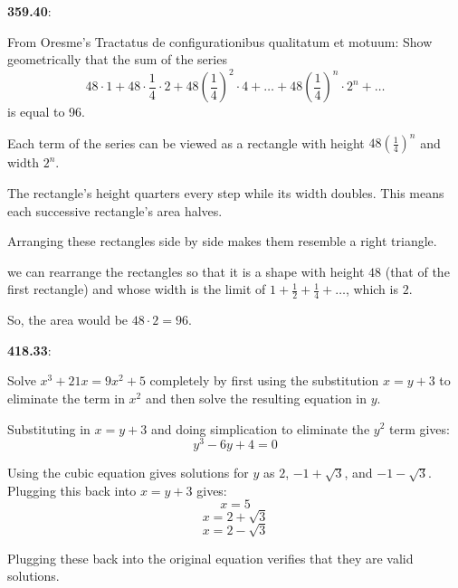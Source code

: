 \documentclass{article}
\begin{document}
\textbf{359.40}:

From Oresme's Tractatus de configurationibus qualitatum et motuum:
Show geometrically that the sum of the series
\[48 \cdot 1 + 48 \cdot \frac{1}{4} \cdot 2 + 48 \left(\frac{1}{4}\right)^2 \cdot 4 + \dots + 48 \left(\frac{1}{4}\right)^n \cdot 2^n + \dots\]
is equal to 96.

Each term of the series can be viewed as a rectangle with height
$48 \left(\frac{1}{4}\right)^n$ and width $2^n$.

The rectangle's height quarters every step while its width doubles.
This means each successive rectangle's area halves.

Arranging these rectangles side by side makes them resemble a right triangle.

we can rearrange the rectangles so that it is a shape with height $48$
(that of the first rectangle) and whose width is the limit of
$1 + \frac{1}{2} + \frac{1}{4} + \dots$, which is $2$.

So, the area would be $48 \cdot 2 = 96$.


\textbf{418.33}:

Solve $x^3 + 21x = 9x^2 + 5$ completely by first using the substitution $x = y+3$
to eliminate the term in $x^2$ and then solve the resulting equation in $y$.

Substituting in $x = y + 3$ and doing simplication to eliminate the $y^2$ term gives:
\[y^3 - 6y + 4 = 0\]

Using the cubic equation gives solutions for $y$ as $2$, $-1 + \sqrt{3}$, and $-1 - \sqrt{3}$.
Plugging this back into $x = y + 3$ gives:
\[x = 5\]
\[x = 2 + \sqrt{3}\]
\[x = 2 - \sqrt{3}\]

Plugging these back into the original equation verifies that they are valid solutions.
\end{document}
